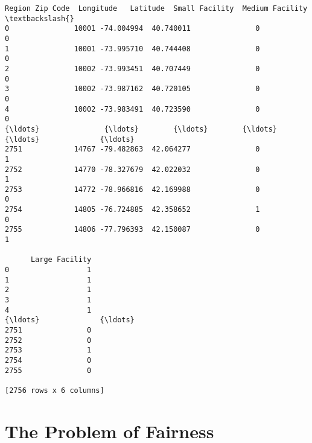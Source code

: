 \documentclass[11pt]{article}
\makeatletter
\newcommand{\boxspacing}{\kern\kvtcb@left@rule\kern\kvtcb@boxsep}
\newcommand{\prompt}[4]{
        {\ttfamily\llap{{\color{#2}[#3]:\hspace{3pt}#4}}\vspace{-\baselineskip}}
    }
\makeatother
\begin{document}
            \begin{tcolorbox}[breakable, size=fbox, boxrule=.5pt, pad at break*=1mm, opacityfill=0]
\prompt{Out}{outcolor}{28}{\boxspacing}
\begin{Verbatim}[commandchars=\\\{\}]
      Region Zip Code  Longitude   Latitude  Small Facility  Medium Facility  \textbackslash{}
0               10001 -74.004994  40.740011               0                0
1               10001 -73.995710  40.744408               0                0
2               10002 -73.993451  40.707449               0                0
3               10002 -73.987162  40.720105               0                0
4               10002 -73.983491  40.723590               0                0
{\ldots}               {\ldots}        {\ldots}        {\ldots}             {\ldots}              {\ldots}
2751            14767 -79.482863  42.064277               0                1
2752            14770 -78.327679  42.022032               0                1
2753            14772 -78.966816  42.169988               0                0
2754            14805 -76.724885  42.358652               1                0
2755            14806 -77.796393  42.150087               0                1

      Large Facility
0                  1
1                  1
2                  1
3                  1
4                  1
{\ldots}              {\ldots}
2751               0
2752               0
2753               1
2754               0
2755               0

[2756 rows x 6 columns]
\end{Verbatim}
\end{tcolorbox}
        
    \hypertarget{the-problem-of-fairness}{%
\section{The Problem of Fairness}\label{the-problem-of-fairness}}
\end{document}
